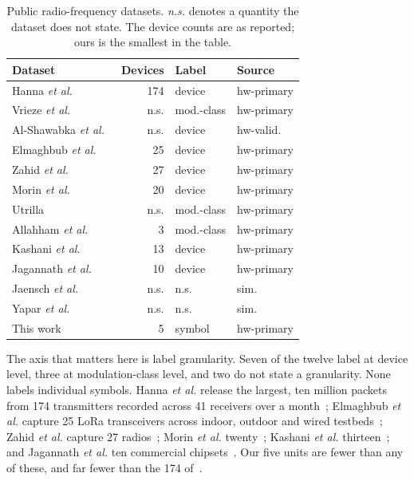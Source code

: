 \documentclass[journal]{IEEEtran}   %
\begin{document}
\begin{table}[!t]
\caption{Public radio-frequency datasets. \emph{n.s.} denotes a quantity the
dataset does not state. The device counts are as reported; ours is the smallest
in the table.}
\label{tab:related_c}
\centering
\begin{tabular}{lrll}
\toprule
Dataset & Devices & Label & Source \\
\midrule
Hanna \textit{et al.}~\cite{hanna2022WiSig} & 174 & device & hw-primary \\
Vrieze \textit{et al.}~\cite{vrieze2018earnestRF} & n.s. & mod.-class & hw-primary \\
Al-Shawabka \textit{et al.}~\cite{amani2020fingerprint} & n.s. & device & hw-valid. \\
Elmaghbub \textit{et al.}~\cite{bub2021usecase} & 25 & device & hw-primary \\
Zahid \textit{et al.}~\cite{zahid2025comrad} & 27 & device & hw-primary \\
Morin \textit{et al.}~\cite{Morin2019Transmitter} & 20 & device & hw-primary \\
Utrilla~\cite{Utrilla2020MIGOU-MOD} & n.s. & mod.-class & hw-primary \\
Allahham \textit{et al.}~\cite{saria2019droneRF} & 3 & mod.-class & hw-primary \\
Kashani \textit{et al.}~\cite{kashani2024BLE} & 13 & device & hw-primary \\
Jagannath \textit{et al.}~\cite{jagannat2024commercialDevice} & 10 & device & hw-primary \\
Jaensch \textit{et al.}~\cite{jaensch2024radiomapestimation} & n.s. & n.s. & sim. \\
Yapar \textit{et al.}~\cite{yapar2024datasetpathlosstoaradio} & n.s. & n.s. & sim. \\
\addlinespace
This work & 5 & symbol & hw-primary \\
\bottomrule
\end{tabular}
\end{table}

The axis that matters here is label granularity. Seven of the twelve label at
device level, three at modulation-class level, and two do not state a
granularity. None labels individual symbols. Hanna \textit{et al.} release the
largest, ten million packets from 174 transmitters recorded across 41 receivers
over a month~\cite{hanna2022WiSig}; Elmaghbub \textit{et al.} capture 25 LoRa
transceivers across indoor, outdoor and wired
testbeds~\cite{bub2021usecase}; Zahid \textit{et al.} capture 27
radios~\cite{zahid2025comrad}; Morin \textit{et al.}
twenty~\cite{Morin2019Transmitter}; Kashani \textit{et al.}
thirteen~\cite{kashani2024BLE}; and Jagannath \textit{et al.} ten commercial
chipsets~\cite{jagannat2024commercialDevice}. Our five units are fewer than any
of these, and far fewer than the 174 of~\cite{hanna2022WiSig}.
\end{document}

